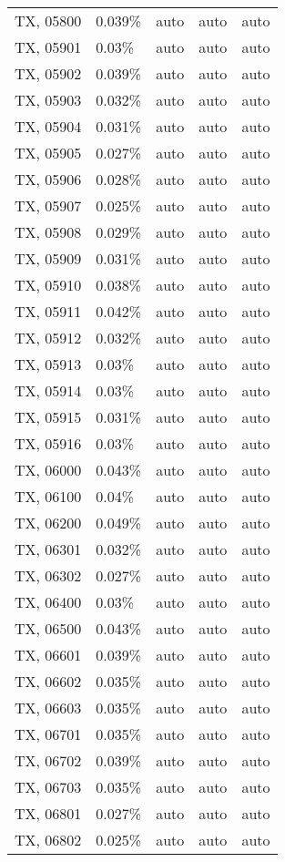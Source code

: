 \begin{longtable}[]{@{}lllll@{}}
TX, 05800 & 0.039\% & auto & auto & auto \\
TX, 05901 & 0.03\% & auto & auto & auto \\
TX, 05902 & 0.039\% & auto & auto & auto \\
TX, 05903 & 0.032\% & auto & auto & auto \\
TX, 05904 & 0.031\% & auto & auto & auto \\
TX, 05905 & 0.027\% & auto & auto & auto \\
TX, 05906 & 0.028\% & auto & auto & auto \\
TX, 05907 & 0.025\% & auto & auto & auto \\
TX, 05908 & 0.029\% & auto & auto & auto \\
TX, 05909 & 0.031\% & auto & auto & auto \\
TX, 05910 & 0.038\% & auto & auto & auto \\
TX, 05911 & 0.042\% & auto & auto & auto \\
TX, 05912 & 0.032\% & auto & auto & auto \\
TX, 05913 & 0.03\% & auto & auto & auto \\
TX, 05914 & 0.03\% & auto & auto & auto \\
TX, 05915 & 0.031\% & auto & auto & auto \\
TX, 05916 & 0.03\% & auto & auto & auto \\
TX, 06000 & 0.043\% & auto & auto & auto \\
TX, 06100 & 0.04\% & auto & auto & auto \\
TX, 06200 & 0.049\% & auto & auto & auto \\
TX, 06301 & 0.032\% & auto & auto & auto \\
TX, 06302 & 0.027\% & auto & auto & auto \\
TX, 06400 & 0.03\% & auto & auto & auto \\
TX, 06500 & 0.043\% & auto & auto & auto \\
TX, 06601 & 0.039\% & auto & auto & auto \\
TX, 06602 & 0.035\% & auto & auto & auto \\
TX, 06603 & 0.035\% & auto & auto & auto \\
TX, 06701 & 0.035\% & auto & auto & auto \\
TX, 06702 & 0.039\% & auto & auto & auto \\
TX, 06703 & 0.035\% & auto & auto & auto \\
TX, 06801 & 0.027\% & auto & auto & auto \\
TX, 06802 & 0.025\% & auto & auto & auto \\

\end{longtable}
